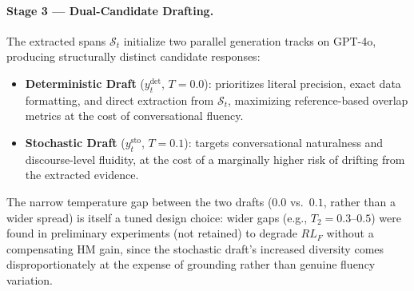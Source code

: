 \paragraph{Stage 3 --- Dual-Candidate Drafting.}
The extracted spans $\mathcal{S}_t$ initialize two parallel generation tracks on GPT-4o, producing structurally distinct candidate responses:
\begin{itemize}
    \item \textbf{Deterministic Draft} ($y_t^{\text{det}}$, $T{=}0.0$): prioritizes literal precision, exact data formatting, and direct extraction from $\mathcal{S}_t$, maximizing reference-based overlap metrics at the cost of conversational fluency.
    \item \textbf{Stochastic Draft} ($y_t^{\text{sto}}$, $T{=}0.1$): targets conversational naturalness and discourse-level fluidity, at the cost of a marginally higher risk of drifting from the extracted evidence.
\end{itemize}
The narrow temperature gap between the two drafts ($0.0$ vs.\ $0.1$, rather than a wider spread) is itself a tuned design choice: wider gaps (e.g., $T_2{=}0.3$--$0.5$) were found in preliminary experiments (not retained) to degrade $RL_F$ without a compensating HM gain, since the stochastic draft's increased diversity comes disproportionately at the expense of grounding rather than genuine fluency variation.

